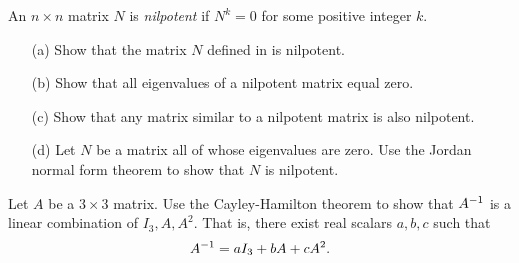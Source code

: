 \documentclass{ximera}
\begin{document}
\begin{exercise} \label{c10.5.5}
An $n\times n$ matrix $N$ is 
{\em nilpotent\/} 
if $N^k=0$ for some positive integer $k$.
\begin{itemize}
\item[(a)]  Show that the matrix $N$ defined in  is nilpotent.
\item[(b)]  Show that all eigenvalues of a nilpotent matrix equal zero.
\item[(c)]  Show that any matrix similar to a nilpotent matrix is also 
	nilpotent.
\item[(d)]  Let $N$ be a matrix all of whose eigenvalues are zero.  Use 
	the Jordan normal form theorem to show that $N$ is nilpotent.
\end{itemize}
\end{exercise}

\begin{exercise} \label{c10.5.5C}
Let $A$ be a $3\times 3$ matrix.  Use the Cayley-Hamilton theorem to show that
$A^{-1}$ is a linear combination of $I_3,A,A^2$.  That is, there exist real 
scalars $a,b,c$ such that 
\[
A^{-1} = aI_3 + bA + cA^2.
\]
\end{exercise}

\CEXER
\end{document}
